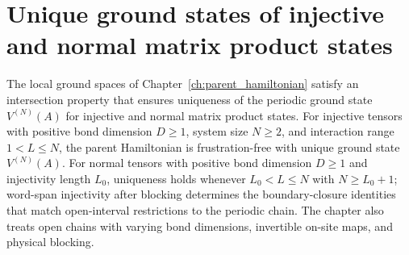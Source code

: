 \chapter{Unique ground states of injective and normal matrix product states}
\label{ch:parent_hamiltonian_unique_ground_states}

The local ground spaces of Chapter~\ref{ch:parent_hamiltonian} satisfy an
intersection property that ensures uniqueness of the periodic ground state
$V^{(N)}(A)$ for injective and normal matrix product states. For injective tensors with positive bond dimension
$D\ge1$, system size $N\ge2$, and interaction range $1<L\le N$, the parent
Hamiltonian is frustration-free with unique ground state $V^{(N)}(A)$.
For normal tensors with positive bond dimension $D \ge 1$ and injectivity length
$L_0$, uniqueness holds whenever $L_0 < L \le N$ with $N \ge L_0 + 1$;
word-span injectivity after blocking determines the boundary-closure identities
that match open-interval restrictions to the periodic chain.
The chapter also treats open chains with varying bond dimensions, invertible
on-site maps, and physical blocking.











